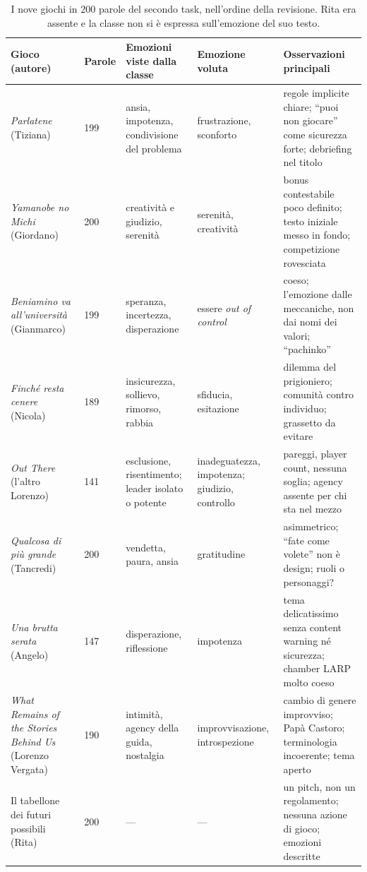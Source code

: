 \begin{table}[htbp]
\centering
\small
\begin{tabular}{@{}p{2.6cm}p{1.2cm}p{3.1cm}p{3.0cm}p{3.6cm}@{}}
\toprule
\textbf{Gioco (autore)} & \textbf{Parole} & \textbf{Emozioni viste dalla classe} &
\textbf{Emozione voluta} & \textbf{Osservazioni principali} \\
\midrule
\emph{Parlatene} (Tiziana) & 199 & ansia, impotenza, condivisione del problema &
frustrazione, sconforto & regole implicite chiare; ``puoi non giocare'' come
sicurezza forte; debriefing nel titolo \\
\emph{Yamanobe no Michi} (Giordano) & 200 & creatività e giudizio, serenità &
serenità, creatività & bonus contestabile poco definito; testo iniziale messo in
fondo; competizione rovesciata \\
\emph{Beniamino va all'università} (Gianmarco) & 199 & speranza, incertezza,
disperazione & essere \emph{out of control} & coeso; l'emozione dalle meccaniche,
non dai nomi dei valori; ``pachinko'' \\
\emph{Finché resta cenere} (Nicola) & 189 & insicurezza, sollievo, rimorso, rabbia &
sfiducia, esitazione & dilemma del prigioniero; comunità contro individuo;
grassetto da evitare \\
\emph{Out There} (l'altro Lorenzo) & 141 & esclusione, risentimento; leader isolato
o potente & inadeguatezza, impotenza; giudizio, controllo & pareggi, player count,
nessuna soglia; agency assente per chi sta nel mezzo \\
\emph{Qualcosa di più grande} (Tancredi) & 200 & vendetta, paura, ansia & gratitudine
& asimmetrico; ``fate come volete'' non è design; ruoli o personaggi? \\
\emph{Una brutta serata} (Angelo) & 147 & disperazione, riflessione & impotenza &
tema delicatissimo senza content warning né sicurezza; chamber LARP molto coeso \\
\emph{What Remains of the Stories Behind Us} (Lorenzo Vergata) & 190 & intimità,
agency della guida, nostalgia & improvvisazione, introspezione & cambio di genere
improvviso; Papà Castoro; terminologia incoerente; tema aperto \\
Il tabellone dei futuri possibili (Rita) & 200 & --- & --- & un pitch, non un
regolamento; nessuna azione di gioco; emozioni descritte \\
\bottomrule
\end{tabular}
\caption{I nove giochi in 200 parole del secondo task, nell'ordine della revisione.
Rita era assente e la classe non si è espressa sull'emozione del suo testo.}
\label{a6:tab:giochi}
\end{table}

